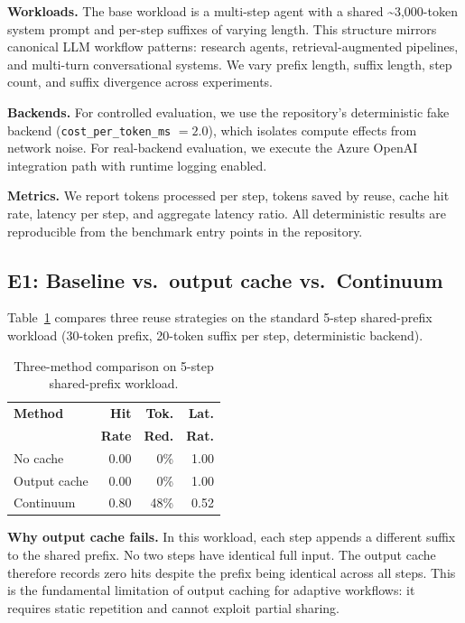 \documentclass[10pt,twocolumn]{article}
\begin{document}
\textbf{Workloads.} The base workload is a multi-step agent with a shared \textasciitilde3,000-token system prompt and per-step suffixes of varying length. This structure mirrors canonical LLM workflow patterns: research agents, retrieval-augmented pipelines, and multi-turn conversational systems. We vary prefix length, suffix length, step count, and suffix divergence across experiments.

\textbf{Backends.} For controlled evaluation, we use the repository's deterministic fake backend (\texttt{cost\_per\_token\_ms} $= 2.0$), which isolates compute effects from network noise. For real-backend evaluation, we execute the Azure OpenAI integration path with runtime logging enabled.

\textbf{Metrics.} We report tokens processed per step, tokens saved by reuse, cache hit rate, latency per step, and aggregate latency ratio. All deterministic results are reproducible from the benchmark entry points in the repository.

\subsection{E1: Baseline vs.\ output cache vs.\ Continuum}

Table~\ref{tab:three-methods} compares three reuse strategies on the standard 5-step shared-prefix workload (30-token prefix, 20-token suffix per step, deterministic backend).

\begin{table}[t]
\centering
{\small
\caption{Three-method comparison on 5-step shared-prefix workload.}
\label{tab:three-methods}
\begin{tabular}{@{}lrrr@{}}
\toprule
\textbf{Method} & \textbf{Hit} & \textbf{Tok.} & \textbf{Lat.} \\
 & \textbf{Rate} & \textbf{Red.} & \textbf{Rat.} \\
\midrule
No cache              & 0.00 &  0\% & 1.00 \\
Output cache          & 0.00 &  0\% & 1.00 \\
Continuum             & 0.80 & 48\% & 0.52 \\
\bottomrule
\end{tabular}
}
\end{table}

\textbf{Why output cache fails.} In this workload, each step appends a different suffix to the shared prefix. No two steps have identical full input. The output cache therefore records zero hits despite the prefix being identical across all steps. This is the fundamental limitation of output caching for adaptive workflows: it requires static repetition and cannot exploit partial sharing.
\end{document}
